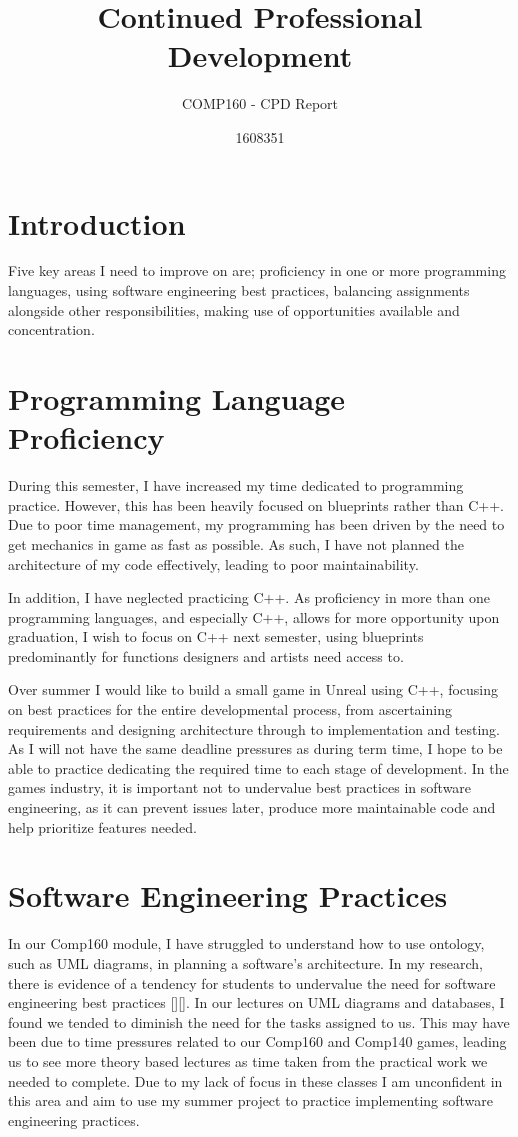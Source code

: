 \documentclass{scrartcl}
\title{Continued Professional Development}
\subtitle{COMP160 - CPD Report}
\author{1608351}
\begin{document}
\maketitle

\section{Introduction}

Five key areas I need to improve on are; proficiency in one or more programming languages, using software engineering best practices, balancing assignments alongside other responsibilities, making use of opportunities available and concentration. 
\cite{shannon}

\section{Programming Language Proficiency}

During this semester, I have increased my time dedicated to programming practice. However, this has been heavily focused on blueprints rather than C++. Due to poor time management, my programming has been driven by the need to get mechanics in game as fast as possible. As such, I have not planned the architecture of my code effectively, leading to poor maintainability.

In addition, I have neglected practicing C++. As proficiency in more than one programming languages, and especially C++, allows for more opportunity upon graduation, I wish to focus on C++ next semester, using blueprints predominantly for functions designers and artists need access to.

Over summer I would like to build a small game in Unreal using C++, focusing on best practices for the entire developmental process, from ascertaining requirements and designing architecture through to implementation and testing. As I will not have the same deadline pressures as during term time, I hope to be able to practice dedicating the required time to each stage of development. In the games industry, it is important not to undervalue best practices in software engineering, as it can prevent issues later, produce more maintainable code and help prioritize features needed.

\section{Software Engineering Practices}

In our Comp160 module, I have struggled to understand how to use ontology, such as UML diagrams, in planning a software's architecture. In my research, there is evidence of a tendency for students to undervalue the need for software engineering best practices [][]. In our lectures on UML diagrams and databases, I found we tended to diminish the need for the tasks assigned to us. This may have been due to time pressures related to our Comp160 and Comp140 games, leading us to see more theory based lectures as time taken from the practical work we needed to complete. Due to my lack of focus in these classes I am unconfident in this area and aim to use my summer project to practice implementing software engineering practices. 
\end{document}
